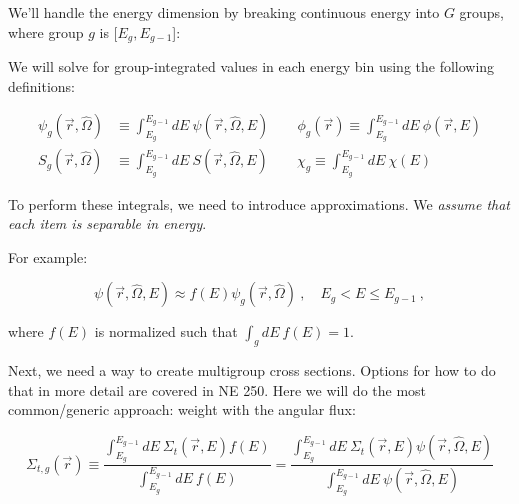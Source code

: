 \documentclass[12pt]{article}
\newcommand{\rvec}{\ensuremath{\vec{r}}}
\newcommand{\vOmega}{\ensuremath{\hat{\Omega}}}
\begin{document}
We'll handle the energy dimension by breaking continuous energy 
into $G$ groups, where group $g$ is [$E_{g}, E_{g-1}$]:

\begin{center}
\end{center}

We will solve for group-integrated values in each energy bin using the following definitions:

\begin{align*}
\psi_g(\rvec, \vOmega) &\equiv \int_{E_g}^{E_{g-1}} dE\:
\psi(\rvec, \vOmega, E) \qquad
\phi_g(\rvec) \equiv \int_{E_g}^{E_{g-1}} dE\: \phi(\rvec,  E)\\
S_g(\rvec, \vOmega) &\equiv \int_{E_g}^{E_{g-1}} dE\:
S(\rvec, \vOmega, E) \qquad
\chi_g \equiv \int_{E_g}^{E_{g-1}} dE\: \chi(E)
\end{align*}

To perform these integrals, we need to introduce approximations. We
\textit{assume that each item is separable in energy}.

For example:

\[
\psi(\vec{r}, \vOmega, E) \approx f(E)\psi_g(\vec{r}, \vOmega)\:,
\quad E_g < E \leq E_{g-1}\:,
\]

where $f(E)$ is normalized such that $\int_g dE\: f(E) = 1$.

Next, we need a way to create multigroup cross sections. Options for how to do 
that in more detail are covered in NE 250. Here we will do the most
common/generic approach: weight with the angular flux:

\[
\Sigma_{t,g}(\vec{r}) \equiv \frac{\int_{E_g}^{E_{g-1}} dE\:
\Sigma_t(\rvec, E) f(E)}{\int_{E_g}^{E_{g-1}} dE\: f(E)} =
\frac{\int_{E_g}^{E_{g-1}} dE\:
\Sigma_t(\rvec, E) \psi(\rvec, \vOmega, E)}{\int_{E_g}^{E_{g-1}} dE\:
\psi(\rvec, \vOmega, E)}
\]
\end{document}
